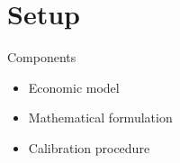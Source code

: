 \section{Setup}
\begin{frame}{Components}
\begin{itemize}\setlength\itemsep{1em}
\item Economic model
\item Mathematical formulation
\item Calibration procedure
\end{itemize}
\end{frame}





